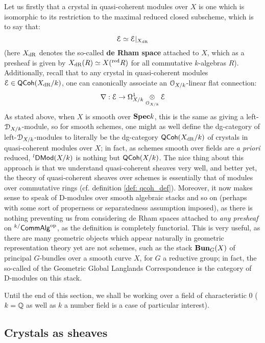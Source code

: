             Let us firstly that a crystal in quasi-coherent modules over $X$ is one which is isomorphic to its restriction to the maximal reduced closed subscheme, which is to say that:
                $$\mathcal{E} \simeq \mathcal{E}|_{X_{\mathrm{dR}}}$$
            (here $X_{\mathrm{dR}}$ denotes the so-called \textbf{de Rham space} attached to $X$, which as a presheaf is given by $X_{\mathrm{dR}}(R) \simeq X({}^{\mathrm{red}}R)$ for all commutative $k$-algebras $R$). Additionally, recall that to any crystal in quasi-coherent modules $\mathcal{E} \in \mathsf{QCoh}(X_{\mathrm{dR}}/k)$, one can canonically associate an $\mathcal{O}_{X/k}$-linear flat connection:
                $$\nabla: \E \to \Omega^1_{X/k} \tensor_{\calO_{X/k}} \E$$
            As stated above, when $X$ is smooth over $\mathbf{Spec} k$, this is the same as giving a left-$\mathcal{D}_{X/k}$-module, so for smooth schemes, one might as well define the dg-category of left-$\mathcal{D}_{X/k}$-modules to literally be the dg-category $\mathsf{QCoh}(X_{\mathrm{dR}}/k)$ of crystals in quasi-coherent modules over $X$; in fact, as schemes smooth over fields are \textit{a priori} reduced, ${}^l\mathsf{DMod}(X/k)$ is nothing but $\mathsf{QCoh}(X/k)$. The nice thing about this approach is that we understand quasi-coherent sheaves very well, and better yet, the theory of quasi-coherent sheaves over schemes is essentially that of modules over commutative rings (cf. definition \ref{def: qcoh_def}). Moreover, it now makes sense to speak of D-modules over smooth algebraic stacks and so on (perhaps with some sort of properness or separatedness assumption imposed), as there is nothing preventing us from considering de Rham spaces attached to \textit{any presheaf} on ${}^{k/}\mathsf{Comm}\mathsf{Alg}^{\mathrm{op}}$, as the definition is completely functorial. This is very useful, as there are many geometric objects which appear naturally in geometric representation theory yet are not schemes, such as the stack $\mathbf{Bun}_G(X)$ of principal $G$-bundles over a smooth curve $X$, for $G$ a reductive group; in fact, the so-called  of the Geometric Global Langlands Correspondence is the category of D-modules on this stack.
        
        \begin{convention}
            Until the end of this section, we shall be working over a field of characteristic $0$ ($k = \mathbb{Q}$ as well as $k$ a number field is a case of particular interest).
        \end{convention}
    
        \subsection{Crystals as sheaves}
